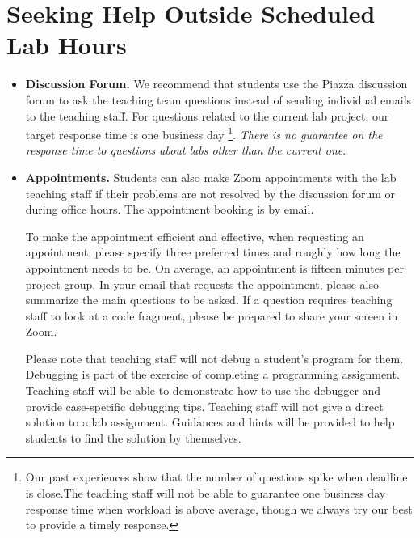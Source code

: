 \section*{Seeking Help Outside Scheduled Lab Hours}
\begin{itemize}
    \item{\bf Discussion Forum.}
      We recommend that students use the Piazza discussion forum to ask the teaching team questions instead of sending individual emails to the teaching staff.
      For questions related to the current lab project, our target response time is one business day
      \footnote{Our past experiences show that the number of questions spike when deadline is close.The teaching staff will not be able to guarantee one business day response time when workload is above average, though we always try our best to provide a timely response.}. 
    {\em There is no guarantee on the response time to questions about labs other than the current one}.
    \item{\bf Appointments.}
    Students can also make Zoom appointments with the lab teaching staff if their problems are not resolved by the discussion forum or during office hours. The appointment booking is by email.
    
    To make the appointment efficient and effective, when requesting an appointment, 
    please specify three preferred times and roughly how long 
    the appointment needs to be. On average, an appointment is fifteen minutes per project group. 
    In your email that requests the appointment, please also summarize the main questions to be asked.
    If a question requires teaching staff to look at a code fragment, please be prepared to share your screen in Zoom.
    
    Please note that teaching staff will not debug a student's program for them. Debugging is part of the exercise of completing a programming assignment. Teaching staff will be able to demonstrate how to use the debugger and provide case-specific debugging tips. Teaching staff will not give a direct solution to a lab assignment. Guidances and hints will be provided to help students to find the solution by themselves.
    
\end{itemize}

